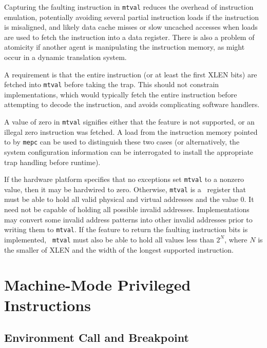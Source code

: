 \begin{commentary}
  Capturing the faulting instruction in {\tt mtval} reduces the
  overhead of instruction emulation, potentially avoiding several
  partial instruction loads if the instruction is misaligned, and
  likely data cache misses or slow uncached accesses when loads are
  used to fetch the instruction into a data register.  There is also a
  problem of atomicity if another agent is manipulating the
  instruction memory, as might occur in a dynamic translation system.

  A requirement is that the entire instruction (or at least the first
  XLEN bits) are fetched into {\tt mtval} before taking the trap.
  This should not constrain implementations, which would typically
  fetch the entire instruction before attempting to decode the
  instruction, and avoids complicating software handlers.

  A value of zero in {\tt mtval} signifies either that the feature is
  not supported, or an illegal zero instruction was fetched.  A load
  from the instruction memory pointed to by {\tt mepc} can be used to
  distinguish these two cases (or alternatively, the system
  configuration information can be interrogated to install the
  appropriate trap handling before runtime).
\end{commentary}

If the hardware platform specifies that no exceptions set {\tt mtval} to a
nonzero value, then it may be hardwired to zero.  Otherwise,
{\tt mtval} is a \warl\ register that must be able to hold all valid physical
and virtual addresses and the value 0.  It need not be capable of holding all
possible invalid addresses.  Implementations may convert some invalid address
patterns into other invalid addresses prior to writing them to {\tt mtval}.
If the feature to return the faulting instruction bits is implemented, {\tt
mtval} must also be able to hold all values less than $2^N$, where $N$ is the
smaller of XLEN and the width of the longest supported instruction.

\section{Machine-Mode Privileged Instructions}

\subsection{Environment Call and Breakpoint}

